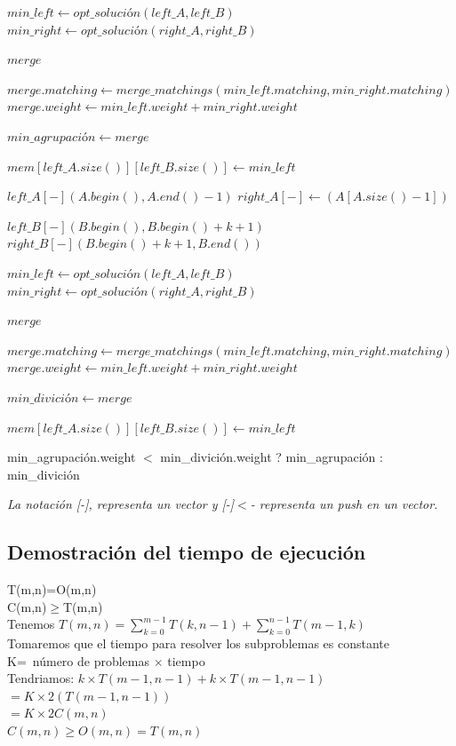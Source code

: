 \documentclass{article}
\begin{document}
\begin{algorithmic}
    \STATE $min\_left\gets opt\_soluci{ó}n(left\_A, left\_B)$
    \STATE $min\_right\gets opt\_soluci{ó}n(right\_A, right\_B)$
    
    \STATE $merge$
    
    \STATE $merge.matching\gets merge\_matchings(min\_left.matching, min\_right.matching)$
    \STATE $merge.weight\gets min\_left.weight+min\_right.weight$
    
        \STATE $min\_agrupaci{ó}n\gets merge$
    \ENDIF
    
    \STATE $mem[left\_A.size()][left\_B.size()]\gets min\_left$
    
\ENDFOR

    \STATE $left\_A[-](A.begin(),A.end()-1)$
    \STATE $right\_A[-]\gets (A[A.size()-1])$
    
    \STATE $left\_B[-](B.begin(),B.begin()+k+1)$
    \STATE $right\_B[-](B.begin()+k+1,B.end())$
    
    \STATE $min\_left\gets opt\_soluci{ó}n(left\_A, left\_B)$
    \STATE $min\_right\gets opt\_soluci{ó}n(right\_A, right\_B)$
    
    \STATE $merge$
    
    \STATE $merge.matching\gets merge\_matchings(min\_left.matching, min\_right.matching)$
    \STATE $merge.weight\gets min\_left.weight+min\_right.weight$
    
        \STATE $min\_divici{ó}n\gets merge$
    \ENDIF
    
    \STATE $mem[left\_A.size()][left\_B.size()]\gets min\_left$
    
\ENDFOR

\RETURN min\_agrupaci{ó}n.weight $<$ min\_divici{ó}n.weight ?  min\_agrupaci{ó}n : min\_divici{ó}n 

\end{algorithmic}
\textit{La notación [-], representa un vector y [-]$<$- representa un push en un vector.}\\

\subsection{Demostración del tiempo de ejecución}
T(m,n)=O(m,n)\\
C(m,n)$\geq${T(m,n)}\\
\textrm {Tenemos} \xrightarrow[]{} $T(m,n) =\sum_{k=0}^{m-1}T(k,n-1)+\sum_{k=0}^{n-1}T(m-1,k)$\\
\textrm {Tomaremos que el tiempo para resolver los subproblemas es constante}\\
K=\ n{ú}mero de problemas $\times$ tiempo\\
\textrm {Tendriamos:} \xrightarrow[]{} $k\times T(m-1,n-1)+k\times T(m-1,n-1)$\\
$=K\times 2(T(m-1,n-1))$\\
$=K\times 2C(m,n)$\\
$C(m,n)\geq{O(m,n)}=T(m,n)$\\
\end{document}
